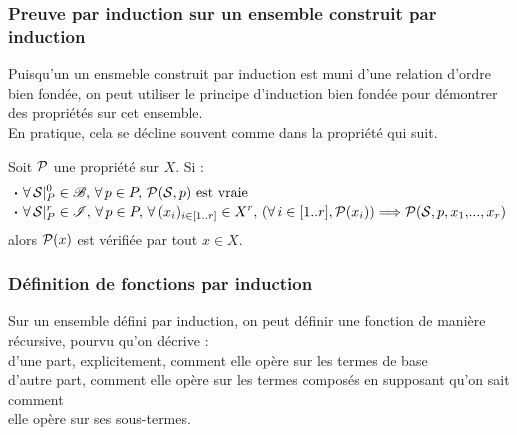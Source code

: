 		\subsubsection{Preuve par induction sur un ensemble construit par induction}
		
			Puisqu'un un ensmeble construit par induction est muni d'une relation d'ordre bien fondée, on peut utiliser le principe d'induction bien fondée pour démontrer des propriétés sur cet ensemble. \\[2mm]
			En pratique, cela se décline souvent comme dans la propriété qui suit.
			
			\eqskip{1mm}
			\begin{Proposition}
				Soit \(\cal{P}\) une propriété sur \(X\). Si :
					\begin{align*}
						& \text{\bdot} \forall\,\cal{S}\constr{0}{P}\in\scr{B},\, \forall\,p\in P, \, \cal{P}(\cal{S},p) \text{ est vraie } \\[-0.5mm]
						& \text{\bdot} \forall\,\cal{S}\constr{r}{P}\in \scr{I}, \,\forall\, p\in P, \,\forall\,(x_i)_{i\in[1..r]} \in X^r, \, (\forall\, i\in [1..r], \cal{P}(x_i)) \Longrightarrow \cal{P}(\cal{S},p,x_1,\!...,x_r)
					\end{align*}alors \(\cal{P}(x)\) est vérifiée par tout \(x\in X\).
			\end{Proposition}
			
			\begin{Preuve}
			\end{Preuve}
			
			
		\subsubsection{Définition de fonctions par induction}
		
			Sur un ensemble défini par induction, on peut définir une fonction de manière récursive, pourvu qu'on décrive : \\
				\hspace*{5mm} \bdot d'une part, explicitement, comment elle opère sur les termes de base \\
				\hspace*{5mm} \bdot d'autre part, comment elle opère sur les termes composés en supposant qu'on sait comment\\\hspace*{5mm} \listspace elle opère sur ses sous-termes.
			
